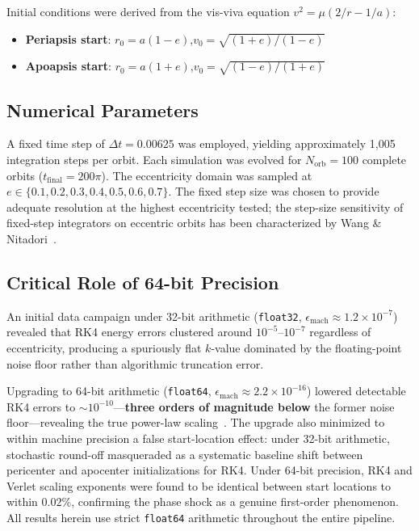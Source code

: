 \documentclass[twocolumn, 10pt]{article}
\begin{document}
Initial conditions were derived from the vis-viva equation $v^2 = \mu(2/r - 1/a)$:
\begin{itemize}[nosep]
    \item \textbf{Periapsis start}: $r_0 = a(1 - e)$,\quad $v_0 = \sqrt{(1 + e)/(1 - e)}$
    \item \textbf{Apoapsis start}: $r_0 = a(1 + e)$,\quad $v_0 = \sqrt{(1 - e)/(1 + e)}$
\end{itemize}

\subsection{Numerical Parameters}

A fixed time step of $\Delta t = 0.00625$ was employed, yielding approximately 1{,}005 integration steps per orbit. Each simulation was evolved for $N_{\text{orb}} = 100$ complete orbits ($t_{\text{final}} = 200\pi$). The eccentricity domain was sampled at $e \in \{0.1, 0.2, 0.3, 0.4, 0.5, 0.6, 0.7\}$. The fixed step size was chosen to provide adequate resolution at the highest eccentricity tested; the step-size sensitivity of fixed-step integrators on eccentric orbits has been characterized by Wang \& Nitadori~\cite{wang2020}.

\subsection{Critical Role of 64-bit Precision}

An initial data campaign under 32-bit arithmetic (\texttt{float32}, $\epsilon_{\text{mach}} \approx 1.2 \times 10^{-7}$) revealed that RK4 energy errors clustered around $10^{-5}$--$10^{-7}$ regardless of eccentricity, producing a spuriously flat $k$-value dominated by the floating-point noise floor rather than algorithmic truncation error.

Upgrading to 64-bit arithmetic (\texttt{float64}, $\epsilon_{\text{mach}} \approx 2.2 \times 10^{-16}$) lowered detectable RK4 errors to $\sim 10^{-10}$---\textbf{three orders of magnitude below} the former noise floor---revealing the true power-law scaling~\cite{hernandez2016}. The upgrade also minimized to within machine precision a false start-location effect: under 32-bit arithmetic, stochastic round-off masqueraded as a systematic baseline shift between pericenter and apocenter initializations for RK4. Under 64-bit precision, RK4 and Verlet scaling exponents were found to be identical between start locations to within $0.02\%$, confirming the phase shock as a genuine first-order phenomenon. All results herein use strict \texttt{float64} arithmetic throughout the entire pipeline.
\end{document}

